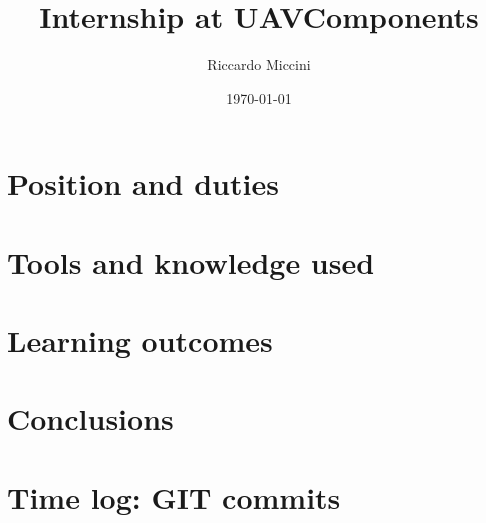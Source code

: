 \documentclass[12pt, a4paper, oneside, final]{article}
\title{Internship at UAVComponents}
\author{Riccardo Miccini}
\date{\today}
\begin{document}
\maketitle



\tableofcontents



\section{Position and duties}


\section{Tools and knowledge used}


\section{Learning outcomes}


\section{Conclusions}


\appendix
\section{Time log: GIT commits}

\end{document}
